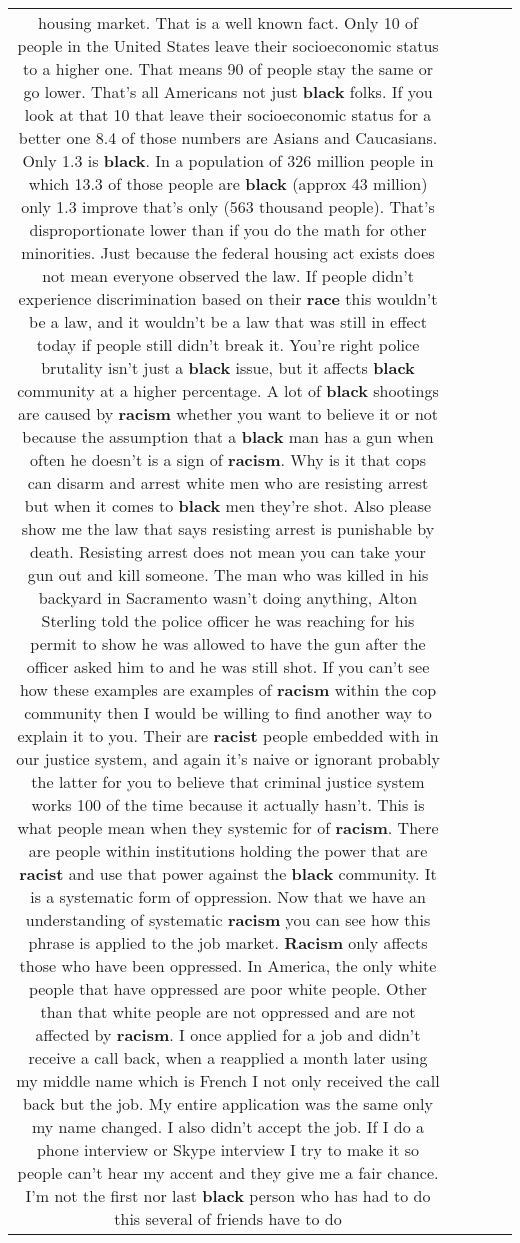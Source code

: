 \documentclass[11pt]{article}
\newlength\mylength
\begin{document}
\begin{center}
\begin{longtable}{|C{.65\mylength}|C{.30\mylength}|C{.12\mylength}|C{.12\mylength}|C{.12\mylength}|}
housing market. That is a well known fact. Only 10 of people in the United States leave their socioeconomic status to a higher one. That means 90 of people stay the same or go lower. That's all Americans not just \textbf{black} folks. If you look at that 10 that leave their socioeconomic status for a better one 8.4 of those numbers are Asians and Caucasians. Only 1.3 is \textbf{black}. In a population of 326 million people in which 13.3 of those people are \textbf{black} (approx 43 million) only 1.3 improve that's only (563 thousand people). That's disproportionate lower than if you do the math for other minorities. Just because the federal housing act exists does not mean everyone observed the law. If people didn't experience discrimination based on their \textbf{race} this wouldn't be a law, and it wouldn't be a law that was still in effect today if people still didn't break it. You're right police brutality isn't just a \textbf{black} issue, but it affects \textbf{black} community at a higher percentage. A lot of \textbf{black} shootings are caused by \textbf{racism} whether you want to believe it or not because the assumption that a \textbf{black} man has a gun when often he doesn't is a sign of \textbf{racism}. Why is it that cops can disarm and arrest white men who are resisting arrest but when it comes to \textbf{black} men they're shot. Also please show me the law that says resisting arrest is punishable by death. Resisting arrest does not mean you can take your gun out and kill someone. The man who was killed in his backyard in Sacramento wasn't doing anything, Alton Sterling told the police officer he was reaching for his permit to show he was allowed to have the gun after the officer asked him to and he was still shot. If you can't see how these examples are examples of \textbf{racism} within the cop community then I would be willing to find another way to explain it to you. Their are \textbf{racist} people embedded with in our justice system, and again it's naive or ignorant probably the latter for you to believe that criminal justice system works 100 of the time because it actually hasn't. This is what people mean when they systemic for of \textbf{racism}. There are people within institutions holding the power that are \textbf{racist} and use that power against the \textbf{black} community. It is a systematic form of oppression. Now that we have an understanding of systematic \textbf{racism} you can see how this phrase is applied to the job market. \textbf{Racism} only affects those who have been oppressed. In America, the only white people that have oppressed are poor white people. Other than that white people are not oppressed and are not affected by \textbf{racism}. I once applied for a job and didn't receive a call back, when a reapplied a month later using my middle name which is French I not only received the call back but the job. My entire application was the same only my name changed. I also didn't accept the job. If I do a phone interview or Skype interview I try to make it so people can't hear my accent and they give me a fair chance. I'm not the first nor last \textbf{black} person who has had to do this several of friends have to do 
\end{longtable}
\end{center}
\end{document}
